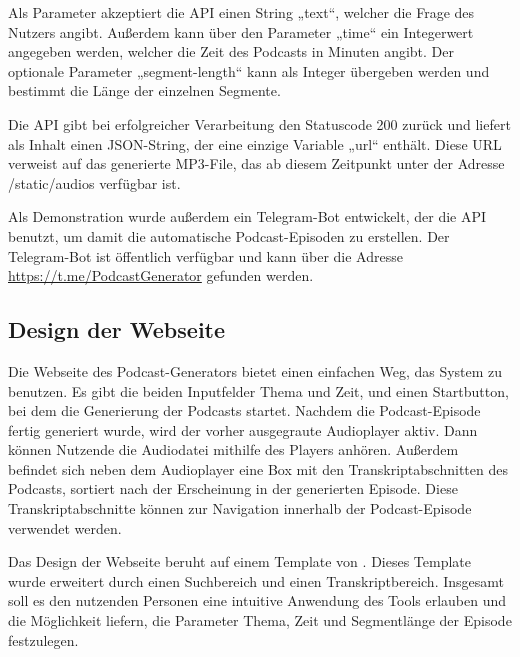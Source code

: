 Als Parameter akzeptiert die API einen String „text“, welcher die Frage des Nutzers angibt.
Außerdem kann über den Parameter „time“ ein Integerwert angegeben werden, welcher die Zeit des Podcasts in Minuten angibt.
Der optionale Parameter „segment-length“ kann als Integer übergeben werden und bestimmt die Länge der einzelnen Segmente.

Die API gibt bei erfolgreicher Verarbeitung den Statuscode 200 zurück und liefert als Inhalt einen JSON-String, der eine einzige Variable „url“ enthält.
Diese URL verweist auf das generierte MP3-File, das ab diesem Zeitpunkt unter der Adresse /static/audios verfügbar ist.

Als Demonstration wurde außerdem ein Telegram-Bot entwickelt, der die API benutzt, um damit die automatische Podcast-Episoden zu erstellen.
Der Telegram-Bot ist öffentlich verfügbar und kann über die Adresse \url{https://t.me/PodcastGenerator} gefunden werden.

\subsection{Design der Webseite}

Die Webseite des Podcast-Generators bietet einen einfachen Weg, das System zu benutzen.
Es gibt die beiden Inputfelder Thema und Zeit, und einen Startbutton, bei dem die Generierung der Podcasts startet.
Nachdem die Podcast-Episode fertig generiert wurde, wird der vorher ausgegraute Audioplayer aktiv.
Dann können Nutzende die Audiodatei mithilfe des Players anhören.
Außerdem befindet sich neben dem Audioplayer eine Box mit den Transkriptabschnitten des Podcasts, sortiert nach der Erscheinung in der generierten Episode.
Diese Transkriptabschnitte können zur Navigation innerhalb der Podcast-Episode verwendet werden.

Das Design der Webseite beruht auf einem Template von \cite{erdem2024}.
Dieses Template wurde erweitert durch einen Suchbereich und einen Transkriptbereich.
Insgesamt soll es den nutzenden Personen eine intuitive Anwendung des Tools erlauben und die Möglichkeit liefern, die Parameter Thema, Zeit und Segmentlänge der Episode festzulegen.

